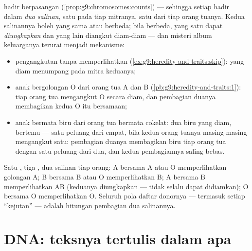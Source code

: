 \begin{proposition}\label{prop:g9:genes-and-dna:twocopies}
 hadir berpasangan
(\cref{prop:g9:chromosomes:counts}) --- sehingga setiap 
hadir dalam \emph{dua salinan}, satu pada tiap mitranya,
satu dari tiap orang tuanya. Kedua salinannya boleh 
yang sama atau berbeda; bila berbeda, yang satu dapat
\emph{diungkapkan} dan yang lain diangkut diam-diam --- dan
misteri album keluarganya terurai menjadi mekanisme:
\begin{itemize}
  \item pengangkutan-tanpa-memperlihatkan
        (\cref{ex:g9:heredity-and-traits:skip}):  yang
        diam menumpang pada mitra keduanya;
  \item anak bergolongan O dari orang tua A dan B
        (\cref{pb:g9:heredity-and-traits:1}): tiap orang tua
        mengangkut O secara diam, dan pembagian duanya
        membagikan kedua O itu bersamaan;
  \item anak bermata biru dari orang tua bermata cokelat:
        dua biru yang diam, bertemu --- satu peluang dari
        empat, bila kedua orang tuanya masing-masing
        mengangkut satu: pembagian duanya membagikan biru
        tiap orang tua dengan satu peluang dari dua, dan
        kedua pembagiannya saling bebas.
\end{itemize}
\end{proposition}
\admitted

\begin{example}\label{ex:g9:genes-and-dna:bloodgroups}
Satu , tiga , dua salinan tiap orang: A bersama A
atau O memperlihatkan golongan A; B bersama B atau O
memperlihatkan B; A bersama B memperlihatkan AB (keduanya
diungkapkan ---  tidak selalu dapat didiamkan); O
bersama O memperlihatkan O. Seluruh pola daftar donornya ---
termasuk setiap ``kejutan'' --- adalah hitungan pembagian
dua salinannya.
\end{example}

\section{DNA: teksnya tertulis dalam apa}

